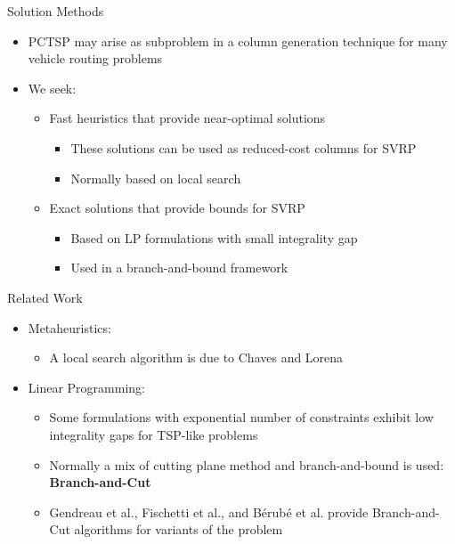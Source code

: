 \begin{frame}[t]{Solution Methods}
    \begin{itemize}
        \item<1-> PCTSP may arise as subproblem in a column generation technique for many vehicle routing problems
        \item<2-> We seek:
            \begin{itemize}
                \item<3-> Fast heuristics that provide near-optimal solutions
                    \begin{itemize}
                        \item<4-> These solutions can be used as reduced-cost columns for SVRP
                        \item<5-> Normally based on local search
                    \end{itemize}
                \item<6-> Exact solutions that provide bounds for SVRP
                    \begin{itemize}
                        \item<7-> Based on LP formulations with small integrality gap
                        \item<8-> Used in a branch-and-bound framework
                    \end{itemize}
                    
            \end{itemize}
    \end{itemize}
\end{frame}


\begin{frame}[t]{Related Work}
\begin{itemize}
    \item<1-> Metaheuristics:
        \begin{itemize}
            \item<2-> A local search algorithm is due to Chaves and Lorena
        \end{itemize}
        \item<3-> Linear Programming:
        \begin{itemize}
            \item<4-> Some formulations with exponential number of constraints exhibit low integrality gaps for TSP-like problems
            \item<5-> Normally a mix of cutting plane method and branch-and-bound is used: \textbf{Branch-and-Cut}
            \item<6-> Gendreau et al., Fischetti et al., and B\'{e}rub\'{e} et al. provide Branch-and-Cut algorithms for variants of the problem
        \end{itemize}
\end{itemize}
\end{frame}

